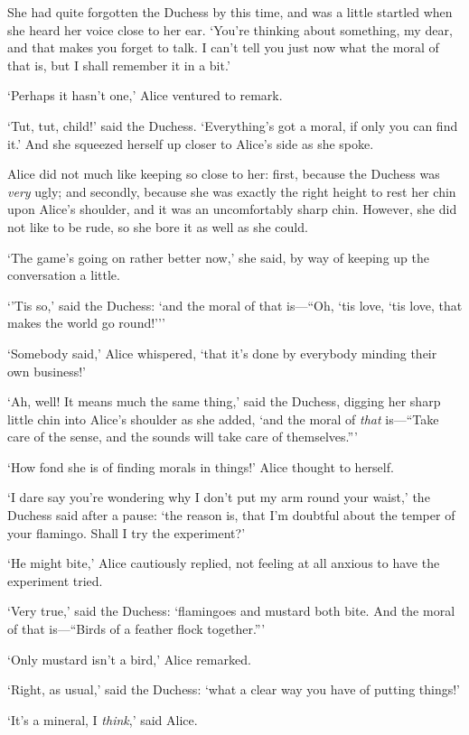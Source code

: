 \documentclass[12pt,openany]{memoir}
\begin{document}
She had quite forgotten the Duchess by this time, and was a little startled when she heard her voice close to her ear. `You're thinking about something, my dear, and that makes you forget to talk. I can't tell you just now what the moral of that is, but I shall remember it in a bit.'

`Perhaps it hasn't one,' Alice ventured to remark.

`Tut, tut, child!' said the Duchess. `Everything's got a moral, if only you can find it.' And she squeezed herself up closer to Alice's side as she spoke.

Alice did not much like keeping so close to her: first, because the Duchess was \textit{very} ugly; and secondly, because she was exactly the right height to rest her chin upon Alice's shoulder, and it was an uncomfortably sharp chin. However, she did not like to be rude, so she bore it as well as she could.

`The game's going on rather better now,' she said, by way of keeping up the conversation a little.

`'Tis so,' said the Duchess: `and the moral of that is---``Oh, `tis love, `tis love, that makes the world go round!'''

`Somebody said,' Alice whispered, `that it's done by everybody minding their own business!'

`Ah, well! It means much the same thing,' said the Duchess, digging her sharp little chin into Alice's shoulder as she added, `and the moral of \textit{that} is---``Take care of the sense, and the sounds will take care of themselves.'''

`How fond she is of finding morals in things!' Alice thought to herself.

`I dare say you're wondering why I don't put my arm round your waist,' the Duchess said after a pause: `the reason is, that I'm doubtful about the temper of your flamingo. Shall I try the experiment?'

`He might bite,' Alice cautiously replied, not feeling at all anxious to have the experiment tried.

`Very true,' said the Duchess: `flamingoes and mustard both bite. And the moral of that is---``Birds of a feather flock together.'''

`Only mustard isn't a bird,' Alice remarked.

`Right, as usual,' said the Duchess: `what a clear way you have of putting things!'

`It's a mineral, I \textit{think},' said Alice.
\end{document}

